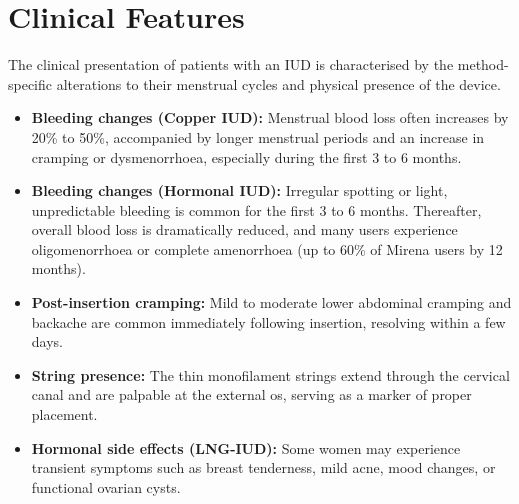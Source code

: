 \section*{Clinical Features}
The clinical presentation of patients with an IUD is characterised by the method-specific alterations to their menstrual cycles and physical presence of the device.
\begin{itemize}
    \item \textbf{Bleeding changes (Copper IUD):} Menstrual blood loss often increases by 20\% to 50\%, accompanied by longer menstrual periods and an increase in cramping or dysmenorrhoea, especially during the first 3 to 6 months.
    \item \textbf{Bleeding changes (Hormonal IUD):} Irregular spotting or light, unpredictable bleeding is common for the first 3 to 6 months. Thereafter, overall blood loss is dramatically reduced, and many users experience oligomenorrhoea or complete amenorrhoea (up to 60\% of Mirena users by 12 months).
    \item \textbf{Post-insertion cramping:} Mild to moderate lower abdominal cramping and backache are common immediately following insertion, resolving within a few days.
    \item \textbf{String presence:} The thin monofilament strings extend through the cervical canal and are palpable at the external os, serving as a marker of proper placement.
    \item \textbf{Hormonal side effects (LNG-IUD):} Some women may experience transient symptoms such as breast tenderness, mild acne, mood changes, or functional ovarian cysts.
\end{itemize}


